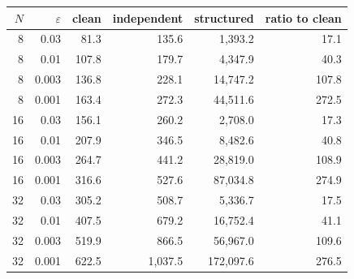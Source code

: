 \begin{tabular}{@{}rr rrrr@{}}
\toprule
$N$ & $\varepsilon$ & clean & independent & structured & ratio to clean\\
\midrule
8 & 0.03 & 81.3 & 135.6 & 1,393.2 & 17.1\\
8 & 0.01 & 107.8 & 179.7 & 4,347.9 & 40.3\\
8 & 0.003 & 136.8 & 228.1 & 14,747.2 & 107.8\\
8 & 0.001 & 163.4 & 272.3 & 44,511.6 & 272.5\\
16 & 0.03 & 156.1 & 260.2 & 2,708.0 & 17.3\\
16 & 0.01 & 207.9 & 346.5 & 8,482.6 & 40.8\\
16 & 0.003 & 264.7 & 441.2 & 28,819.0 & 108.9\\
16 & 0.001 & 316.6 & 527.6 & 87,034.8 & 274.9\\
32 & 0.03 & 305.2 & 508.7 & 5,336.7 & 17.5\\
32 & 0.01 & 407.5 & 679.2 & 16,752.4 & 41.1\\
32 & 0.003 & 519.9 & 866.5 & 56,967.0 & 109.6\\
32 & 0.001 & 622.5 & 1,037.5 & 172,097.6 & 276.5\\
\bottomrule
\end{tabular}

